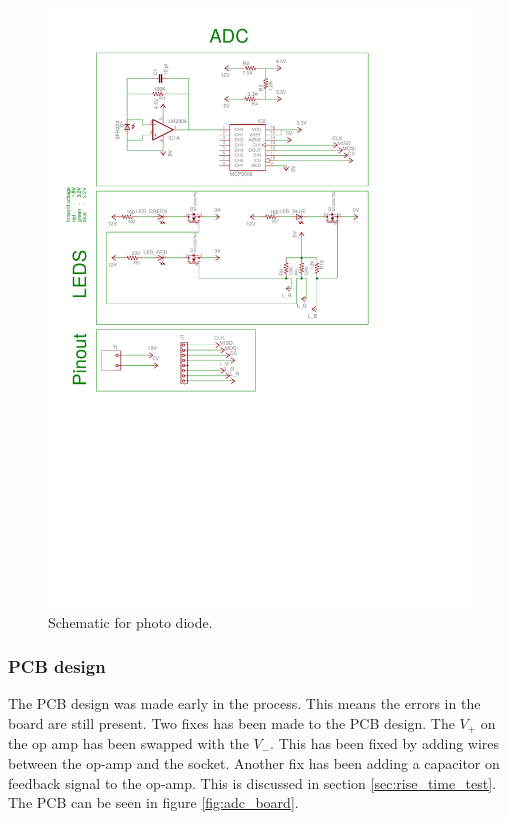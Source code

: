 \begin{figure}[ht]
\centering%
 \includegraphics[scale=0.9,trim={2.4cm 20.8cm 5.1cm 2.2cm},clip]{img/adc_schematic.pdf}
  \caption{Schematic for photo diode.}
  \label{fig:sch_photo_diode}
\end{figure}

\subsubsection{PCB design}
The PCB design was made early in the process.
This means the errors in the board are still present.
Two fixes has been made to the PCB design.
The $V_+$ on the op amp has been swapped with the $V_-$.
This has been fixed by adding wires between the op-amp and the socket.
Another fix has been adding a capacitor on feedback signal to the op-amp.
This is discussed in section \ref{sec:rise_time_test}. 
The PCB can be seen in figure \ref{fig:adc_board}.

